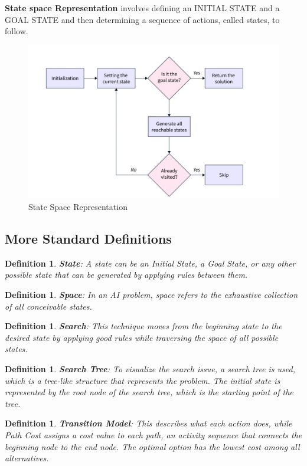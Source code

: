 \documentclass[11pt]{article}
\newtheorem{dfn}[thm]{Definition}
\begin{document}
\textbf{State space Representation} involves defining an INITIAL STATE and a GOAL STATE and
then determining a sequence of actions, called states, to follow.

\begin{figure}[H]
    \centering
    \includegraphics[width=.85\textwidth]{./diagram1.png}
    \caption{State Space Representation}
\end{figure}

\subsection{More Standard Definitions}

\begin{dfn}
    \textbf{State}:
    A state can be an Initial State, a Goal State, or any other possible state that can be
    generated by applying rules between them.

\end{dfn}
\begin{dfn}
    \textbf{Space}:
    In an AI problem, space refers to the exhaustive collection of all conceivable states.
\end{dfn}
\begin{dfn}
    \textbf{Search}:
    This technique moves from the beginning state to the desired state by applying good rules
    while traversing the space of all possible states.
\end{dfn}
\begin{dfn}
    \textbf{Search Tree}:
    To visualize the search issue, a search tree is used, which is a tree-like structure that
    represents the problem. The initial state is represented by the root node of the search tree,
    which is the starting point of the tree.
\end{dfn}
\begin{dfn}
    \textbf{Transition Model}:
    This describes what each action does, while Path Cost assigns a cost value to each path,
    an activity sequence that connects the beginning node to the end node. The optimal
    option has the lowest cost among all alternatives.
\end{dfn}
\end{document}
